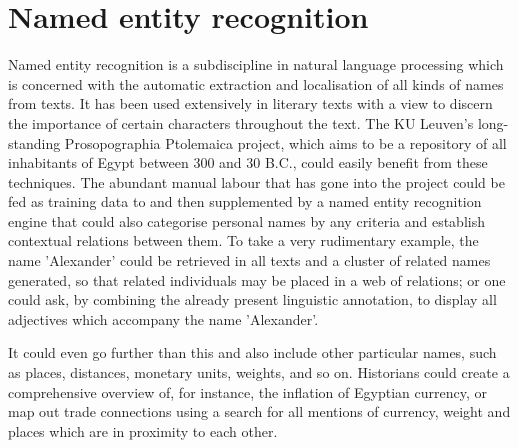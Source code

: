 

\section{Named entity recognition} %
\label{sec:ner}

Named entity recognition is a subdiscipline in natural language processing
which is concerned with the automatic extraction and localisation of all kinds
of names from texts. It has been used extensively in literary texts with a view
to discern the importance of certain characters throughout the text. The KU
Leuven's long-standing Prosopographia Ptolemaica project, which aims to be a
repository of all inhabitants of Egypt between 300 and 30 B.C., could easily
benefit from these techniques. The abundant manual labour that has gone into
the project could be fed as training data to and then supplemented by a named
entity recognition engine that could also categorise personal names by any
criteria and establish contextual relations between them. To take a very
rudimentary example, the name 'Alexander' could be retrieved in all texts and a
cluster of related names generated, so that related individuals may be placed
in a web of relations; or one could ask, by combining the already present
linguistic annotation, to display all adjectives which accompany the name
'Alexander'.

It could even go further than this and also include other particular names,
such as places, distances, monetary units, weights, and so on. Historians could
create a comprehensive overview of, for instance, the inflation of Egyptian
currency, or map out trade connections using a search for all mentions of
currency, weight and places which are in proximity to each other.



